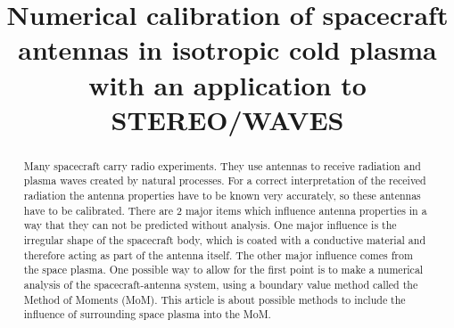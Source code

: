 \documentclass[draft,ras]{agutex}
\begin{document}
%
%


\title{Numerical calibration of spacecraft antennas in isotropic cold plasma with an application to STEREO/WAVES}
%

%
%









%
%


\begin{abstract}
Many spacecraft carry radio experiments. They use antennas to receive radiation and plasma waves created by natural processes. For a correct interpretation of the received radiation the antenna properties have to be known very accurately, so these antennas have to be calibrated. There are 2 major items which influence antenna properties in a way that they can not be predicted without analysis. One major influence is the irregular shape of the spacecraft body, which is coated with a conductive material and therefore acting as part of the antenna itself. The other major influence comes from the space plasma. One possible way to allow for the first point is to make a numerical analysis of the spacecraft-antenna system, using a boundary value method called the Method of Moments (MoM). This article is about possible methods to include the influence of surrounding space plasma into the MoM.
\end{abstract}
\end{document}
